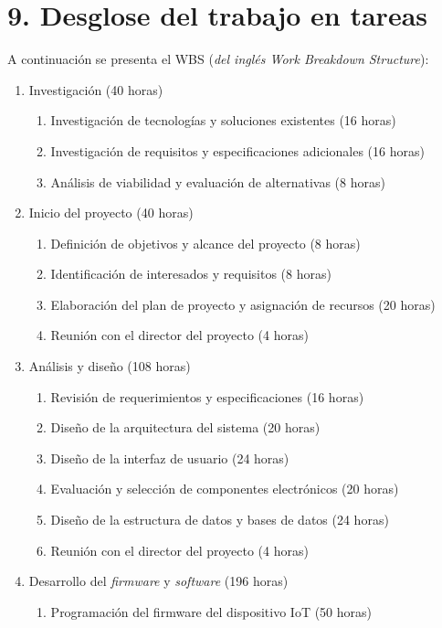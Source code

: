 \documentclass[
11pt, %
]{charter}
\begin{document}
\section{9. Desglose del trabajo en tareas}
\label{sec:wbs}

A continuación se presenta el WBS (\emph{del inglés Work Breakdown Structure}):

\begin{enumerate}
\item Investigación (40 horas)
	\begin{enumerate}	
	\item  Investigación de tecnologías y soluciones existentes (16 horas)
	\item  Investigación de requisitos y especificaciones adicionales (16 horas)
	\item  Análisis de viabilidad y evaluación de alternativas (8 horas)
	\end{enumerate}
\item Inicio del proyecto (40 horas)
	\begin{enumerate}
	\item Definición de objetivos y alcance del proyecto (8 horas)
	\item Identificación de interesados y requisitos (8 horas)
	\item Elaboración del plan de proyecto y asignación de recursos (20 horas)
	\item Reunión con el director del proyecto (4 horas)
	\end{enumerate}
\item Análisis y diseño (108 horas)
	\begin{enumerate}
	\item Revisión de requerimientos y especificaciones (16 horas)
	\item Diseño de la arquitectura del sistema (20 horas)
	\item Diseño de la interfaz de usuario (24 horas)
	\item Evaluación y selección de componentes electrónicos (20 horas)
	\item Diseño de la estructura de datos y bases de datos (24 horas)
	\item Reunión con el director del proyecto (4 horas)
	\end{enumerate}
\item Desarrollo del \emph{firmware} y \emph{software} (196 horas)
	\begin{enumerate}
	\item Programación del firmware del dispositivo IoT (50 horas)

\end{enumerate}
\end{enumerate}
\end{document}
